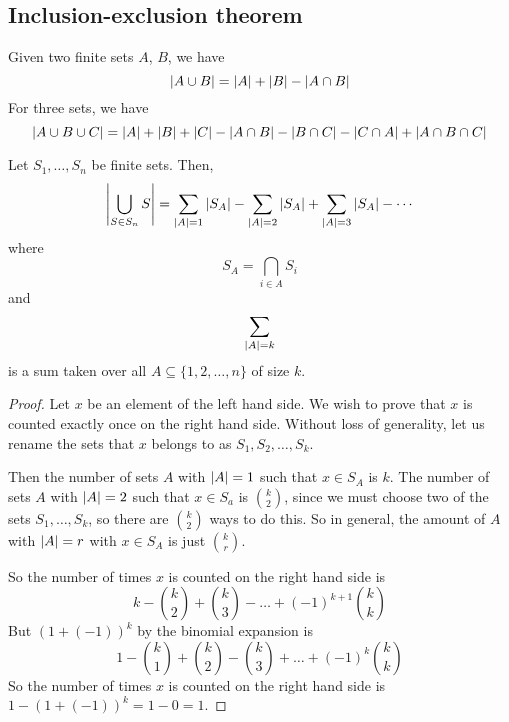 \subsection{Inclusion-exclusion theorem}
Given two finite sets \(A\), \(B\), we have
\[
	\abs{A \cup B} = \abs{A} + \abs{B} - \abs{A \cap B}
\]
For three sets, we have
\[
	\abs{A \cup B \cup C} = \abs{A} + \abs{B} + \abs{C} - \abs{A \cap B} - \abs{B \cap C} - \abs{C \cap A} + \abs{A \cap B \cap C}
\]
\begin{theorem}
	Let \(S_1, \dots, S_n\) be finite sets.
	Then,
	\[
		\abs{\bigcup_{S \in S_n} S} = \sum_{\abs{A} = 1}\abs{S_A} - \sum_{\abs{A} = 2}\abs{S_A} + \sum_{\abs{A} = 3}\abs{S_A} - \cdots
	\]
	where
	\[
		S_A = \bigcap_{i \in A}S_i
	\]
	and
	\[
		\sum_{\abs{A} = k}
	\]
	is a sum taken over all \(A \subseteq \{ 1, 2, \dots, n \}\) of size \(k\).
\end{theorem}
\begin{proof}
	Let \(x\) be an element of the left hand side.
	We wish to prove that \(x\) is counted exactly once on the right hand side.
	Without loss of generality, let us rename the sets that \(x\) belongs to as \(S_1, S_2, \dots, S_k\).

	Then the number of sets \(A\) with \(\abs{A} = 1\) such that \(x \in S_A\) is \(k\).
	The number of sets \(A\) with \(\abs{A} = 2\) such that \(x \in S_a\) is \(\binom{k}{2}\), since we must choose two of the sets \(S_1, \dots, S_k\), so there are \(\binom{k}{2}\) ways to do this.
	So in general, the amount of \(A\) with \(\abs{A} = r\) with \(x \in S_A\) is just \(\binom{k}{r}\).

	So the number of times \(x\) is counted on the right hand side is
	\[
		k - \binom{k}{2} + \binom{k}{3} - \dots + (-1)^{k+1}\binom{k}{k}
	\]
	But \((1 + (-1))^k\) by the binomial expansion is
	\[
		1 - \binom{k}{1} + \binom{k}{2} - \binom{k}{3} + \dots + (-1)^k\binom{k}{k}
	\]
	So the number of times \(x\) is counted on the right hand side is \(1 - (1 + (-1))^k = 1 - 0 = 1\).
\end{proof}

